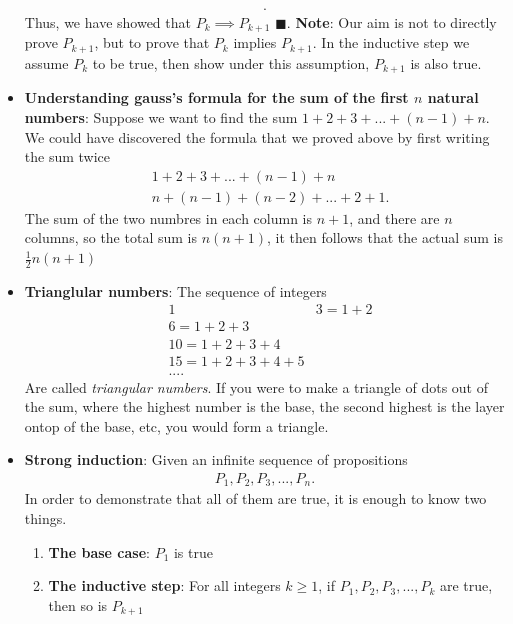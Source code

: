 \documentclass{report}
\begin{document}
\begin{itemize}
\begin{align*}
            .\end{align*}
            Thus, we have showed that $P_{k} \implies P_{k+1}$ $\blacksquare$.
            \bigbreak \noindent 
            \textbf{Note}: Our aim is not to directly prove $P_{k+1}$, but to prove that $P_{k}$ implies $P_{k+1}$. In the inductive step we assume $P_{k}$ to be true, then show under this assumption, $P_{k+1}$ is also true.
        \item \textbf{Understanding gauss's formula for the sum of the first $n$ natural numbers}: Suppose we want to find the sum $1+2+3+...+(n-1)+n$. We could have discovered the formula that we proved above by first writing the sum twice
            \begin{align*}
                &1 + 2  + 3 + ... + (n-1) + n \\
                &n + (n-1) + (n-2) + ... + 2 + 1
            .\end{align*}
            The sum of the two numbres in each column is $n+1$, and there are $n$ columns, so the total sum is $n(n+1)$, it then follows that the actual sum is $\frac{1}{2}n(n+1)$
        \item \textbf{Trianglular numbers}: The sequence of integers
            \begin{align*}
                &1
                &3 = 1+2 \\
                &6 = 1 + 2  + 3 \\
                &10 = 1 + 2 + 3 + 4 \\
                &15  = 1 + 2 + 3 + 4 + 5  \\
                &...
            .\end{align*}
            Are called \textit{triangular numbers}. If you were to make a triangle of dots out of the sum, where the highest number is the base, the second highest is the layer ontop of the base, etc, you would form a triangle.
        \item \textbf{Strong induction}: Given an infinite sequence of propositions
            \begin{align*}
                P_{1}, P_{2}, P_{3}, ..., P_{n}
            .\end{align*}
            In order to demonstrate that all of them are true, it is enough to know two things.
            \begin{enumerate}
                \item \textbf{The base case}: $P_{1}$ is true
                \item \textbf{The inductive step}: For all integers $k \geq 1$, if $P_{1}, P_{2}, P_{3},...,P_{k}$ are true, then so is $P_{k+1}$

\end{enumerate}
\end{itemize}
\end{document}
